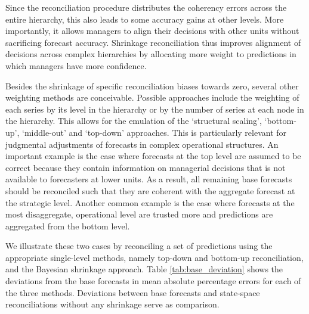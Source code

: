 \documentclass[a4paper,fleqn,11pt]{article}
\begin{document}
Since the reconciliation procedure distributes the coherency errors across the entire hierarchy, this also leads to some accuracy gains at other levels. More importantly, it allows managers to align their decisions with other units without sacrificing forecast accuracy. Shrinkage reconciliation thus improves alignment of decisions across complex hierarchies by allocating more weight to predictions in which managers have more confidence. 

Besides the shrinkage of specific reconciliation biases towards zero, several other weighting methods are conceivable. Possible approaches include the weighting of each series by its level in the hierarchy or by the number of series at each node in the hierarchy. This allows for the emulation of the `structural scaling', `bottom-up', `middle-out' and `top-down' approaches. This is particularly relevant for judgmental adjustments of forecasts in complex operational structures. An important example is the case where forecasts at the top level are assumed to be correct because they contain information on managerial decisions that is not available to forecasters at lower units. As a result, all remaining base forecasts should be reconciled such that they are coherent with the aggregate forecast at the strategic level. Another common example is the case where forecasts at the most disaggregate, operational level are trusted more and predictions are aggregated from the bottom level.

We illustrate these two cases by reconciling a set of predictions using the appropriate single-level methods, namely top-down and bottom-up reconciliation, and the Bayesian shrinkage approach. Table \ref{tab:base_deviation} shows the deviations from the base forecasts in mean absolute percentage errors for each of the three methods. Deviations between base forecasts and state-space reconciliations without any shrinkage serve as comparison.
\end{document}
